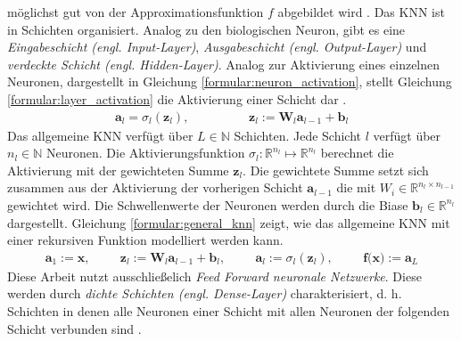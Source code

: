 möglichst gut von der Approximationsfunktion $f$ abgebildet wird \cite{bengio2017deep}.
\newline
\newline
Das KNN ist in Schichten organisiert. Analog zu den biologischen Neuron, gibt es eine \textit{Eingabeschicht (engl. Input-Layer)},
\textit{Ausgabeschicht (engl. Output-Layer)} und \textit{verdeckte Schicht (engl. Hidden-Layer)}.
Analog zur Aktivierung eines einzelnen Neuronen, dargestellt in Gleichung \ref{formular:neuron_activation}, stellt
Gleichung \ref{formular:layer_activation} die Aktivierung einer Schicht dar \cite{higham2019deep}.
\begin{align}
    \label{formular:layer_activation}
    \textbf{a}_{l} = \sigma_l(\textbf{z}_l), \hspace{2cm} \textbf{z}_l := \textbf{W}_l\textbf{a}_{l-1} + \textbf{b}_l
\end{align}
Das allgemeine KNN verfügt über $L\in\mathbb{N}$ Schichten. Jede Schicht $l$ verfügt über $n_l\in\mathbb{N}$ Neuronen.
Die Aktivierungsfunktion $\sigma_l:\mathbb{R}^{n_{l}}\mapsto\mathbb{R}^{n_{l}}$ berechnet die Aktivierung mit der gewichteten Summe $\textbf{z}_l$.
Die gewichtete Summe setzt sich zusammen aus der Aktivierung der vorherigen Schicht $\textbf{a}_{l-1}$ die mit $W_i\in\mathbb{R}^{n_{l}\times{n_{l-1}}}$ gewichtet wird.
Die Schwellenwerte der Neuronen werden durch die Biase $\textbf{b}_l\in\mathbb{R}^{n_{l}}$ dargestellt.
Gleichung \ref{formular:general_knn} zeigt, wie das allgemeine KNN mit einer rekursiven Funktion modelliert werden kann.
\begin{align}
    \label{formular:general_knn}
    \textbf{a}_1 := \textbf{x}, \hspace{1cm}
    \textbf{z}_l := \textbf{W}_l\textbf{a}_{l-1} + \textbf{b}_l, \hspace{1cm}
    \textbf{a}_l := \sigma_l(\textbf{z}_l), \hspace{1cm} \textbf{f(x)} := \textbf{a}_L
\end{align}
Diese Arbeit nutzt ausschließelich \textit{Feed Forward neuronale Netzwerke}.
Diese werden durch \textit{dichte Schichten (engl. Dense-Layer)} charakterisiert, d. h. Schichten in denen alle Neuronen
einer Schicht mit allen Neuronen der folgenden Schicht verbunden sind \cite{bengio2017deep}.





